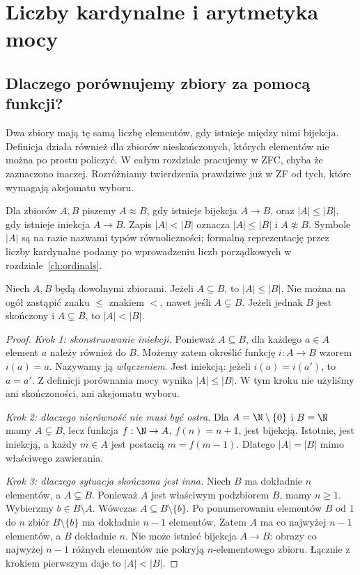 \chapter{Liczby kardynalne i arytmetyka mocy}\label{ch:cardinals}

\section{Dlaczego porównujemy zbiory za pomocą funkcji?}
Dwa zbiory mają tę samą liczbę elementów, gdy istnieje między nimi bijekcja. Definicja działa również dla zbiorów nieskończonych, których elementów nie można po prostu policzyć. W całym rozdziale pracujemy w ZFC, chyba że zaznaczono inaczej. Rozróżniamy twierdzenia prawdziwe już w ZF od tych, które wymagają aksjomatu wyboru.
\begin{definicja}\label{def:card-equipotent}
Dla zbiorów $A,B$ piszemy $A\approx B$, gdy istnieje bijekcja $A\to B$, oraz $|A|\leq |B|$, gdy istnieje iniekcja $A\to B$. Zapis $|A|<|B|$ oznacza $|A|\leq |B|$ i $A\not\approx B$. Symbole $|A|$ są na razie nazwami typów równoliczności; formalną reprezentację przez liczby kardynalne podamy po wprowadzeniu liczb porządkowych w rozdziale~\ref{ch:ordinals}.
\end{definicja}
\begin{twierdzenie}\label{thm:card-subset-monotonicity}
Niech $A,B$ będą dowolnymi zbiorami. Jeżeli $A\subseteq B$, to $|A|\leq |B|$.
Nie można na ogół zastąpić znaku $\leq$ znakiem $<$, nawet jeśli $A\subsetneq B$.
Jeżeli jednak $B$ jest skończony i $A\subsetneq B$, to $|A|<|B|$.
\end{twierdzenie}
\begin{proof}
\emph{Krok 1: skonstruowanie iniekcji.}
Ponieważ $A\subseteq B$, dla każdego $a\in A$ element $a$ należy również do $B$.
Możemy zatem określić funkcję $i:A\to B$ wzorem $i(a)=a$.
Nazywamy ją \emph{włączeniem}. Jest iniekcją: jeżeli $i(a)=i(a')$,
to $a=a'$. Z definicji porównania mocy wynika $|A|\leq |B|$.
W tym kroku nie użyliśmy ani skończoności, ani aksjomatu wyboru.

\emph{Krok 2: dlaczego nierówność nie musi być ostra.}
Dla $A=\N\setminus\{0\}$ i $B=\N$ mamy $A\subsetneq B$, lecz
funkcja $f:\N\to A$, $f(n)=n+1$, jest bijekcją.
Istotnie, jest iniekcją, a każdy $m\in A$ jest postacią
$m=f(m-1)$. Dlatego $|A|=|B|$ mimo właściwego zawierania.

\emph{Krok 3: dlaczego sytuacja skończona jest inna.}
Niech $B$ ma dokładnie $n$ elementów, a $A\subsetneq B$.
Ponieważ $A$ jest właściwym podzbiorem $B$, mamy $n\ge1$.
Wybierzmy $b\in B\setminus A$. Wówczas $A\subseteq B\setminus\{b\}$.
Po ponumerowaniu elementów $B$ od $1$ do $n$ zbiór $B\setminus\{b\}$
ma dokładnie $n-1$ elementów. Zatem $A$ ma co najwyżej $n-1$ elementów,
a $B$ dokładnie $n$. Nie może istnieć bijekcja $A\to B$:
obrazy co najwyżej $n-1$ różnych elementów nie pokryją $n$-elementowego zbioru.
Łącznie z krokiem pierwszym daje to $|A|<|B|$.
\end{proof}
